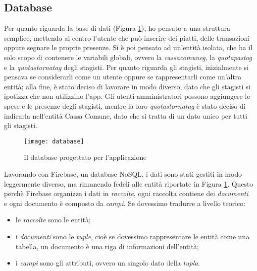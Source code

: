 \newpage

\subsection{Database}

Per quanto riguarda la base di dati (Figura \ref{fig:database}), ho pensato a una struttura semplice, mettendo al centro l'utente che può inserire dei piatti, delle transazioni oppure segnare le proprie presenze.\newline
Si è poi pensato ad un'entità isolata, che ha il solo scopo di contenere le variabili globali, ovvero la \emph{\gls{cassacomuneg}}, la \emph{\gls{quotapastog}} e la \emph{\gls{quotastornatag}} degli stagisti.\newline
Per quanto riguarda gli stagisti, inizialmente si pensava se considerarli come un utente oppure se rappresentarli come un'altra entità; alla fine, è stato deciso di lavorare in modo diverso, dato che gli stagisti si ipotizza che non utilizzino l'app.\newline
Gli utenti amministratori possono aggiungere le spese e le presenze degli stagisti, mentre la loro \emph{\gls{quotastornatag}} è stato deciso di indicarla nell'entità Cassa Comune, dato che si tratta di un dato unico per tutti gli stagisti.\newline
\begin{figure}[!h] 
    \centering 
    \texttt{[image: database]} 
    \caption{Il database progettato per l'applicazione}
    \label{fig:database}
\end{figure}
\newline
Lavorando con Firebase, un database NoSQL, i dati sono stati gestiti in modo leggermente diverso, ma rimanendo fedeli alle entità riportate in Figura \ref{fig:database}.\newline
Questo perchè Firebase organizza i dati in \emph{raccolte}, ogni raccolta contiene dei \emph{documenti} e ogni documento è composto da \emph{campi}.\newline
Se dovessimo tradurre a livello teorico:
\begin{itemize}
    \item le \emph{raccolte} sono le entità;
    \item i \emph{documenti} sono le \emph{tuple}, cioè se dovessimo rappresentare le entità come una tabella, un documento è una riga di informazioni dell'entità;
    \item i \emph{campi} sono gli attributi, ovvero un singolo dato della \emph{tupla}.
\end{itemize}
